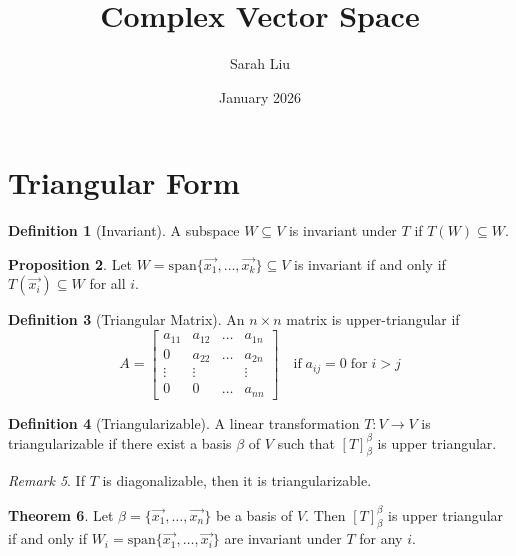 \documentclass{article}
\title{Complex Vector Space}
\author{Sarah Liu}
\date{January 2026}
\theoremstyle{definition}
\newtheorem{theorem}{Theorem}[section]
\newtheorem{proposition}[theorem]{Proposition}
\newtheorem{definition}[theorem]{Definition}
\theoremstyle{remark}
\newtheorem{remark}[theorem]{Remark}
\begin{document}
\maketitle
\section{Triangular Form}
\begin{definition}[Invariant]
    A subspace $W\subseteq V$ is invariant under $T$ if $T(W)\subseteq W$.
\end{definition}

\begin{proposition}
    Let $W=\text{span}\{\vec{x_1},\dots, \vec{x_k}\}\subseteq V$ is invariant if and only if $T(\vec{x_i})\subseteq W$ for all $i$.
\end{proposition}

\begin{definition}[Triangular Matrix]
    An $n\times n$ matrix is upper-triangular if 
    \[
    A=\begin{bmatrix}
        a_{11} & a_{12} & \dots & a_{1n}\\
        0 & a_{22} & \dots & a_{2n}\\
        \vdots & \vdots&&\vdots\\
        0 & 0 & \dots  & a_{nn}
    \end{bmatrix} \quad \text{if} \;a_{ij}=0\;\text{for}\; i>j
    \]
\end{definition}

\begin{definition}[Triangularizable]
    A linear transformation $T:V \rightarrow V$ is triangularizable if there exist a basis $\beta$ of $V$ such that $[T]^{\beta}_{\beta}$ is upper triangular.
\end{definition}

\begin{remark}
    If $T$ is diagonalizable, then it is triangularizable.
\end{remark}

\begin{theorem}
    Let $\beta=\{\vec{x_1},\dots,\vec{x_n}\}$ be a basis of $V$. Then $[T]_{\beta}^{\beta}$ is upper triangular if and only if $W_i=\text{span}\{\vec{x_1},\dots,\vec{x_i}\}$ are invariant under $T$ for any $i$.
\end{theorem}
\end{document}
